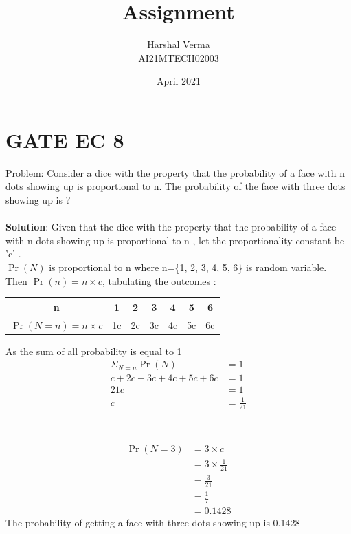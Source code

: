 \documentclass[journal,12pt,twocolumn]{IEEEtran}
\title{Assignment  }
\author{Harshal Verma\\
AI21MTECH02003}
\date{April 2021}
\begin{document}
\maketitle
\section{GATE EC 8}
Problem: Consider a dice with the property that the probability of a face with n dots showing up is proportional to n. The probability of the face with three dots showing up is ?\\
\\
\textbf{Solution}: Given that the dice with the
 property that the probability of a face with n dots showing up is proportional to n , let the proportionality constant be 'c' .\\
 $\Pr(N)$ is proportional to n
 where n=\{1, 2, 3, 4, 5, 6\} is random variable.\\
Then $\Pr(n) = n \times c $, tabulating the outcomes : 
\\
\begin{center}
\begin{tabular}{ |c | c | c | c | c | c | c |}
\hline
n     & 1 & 2 & 3 & 4 & 5 & 6 \\
\hline
$\Pr(N = n ) = n \times c$ & 1c & 2c&3c &4c & 5c & 6c\\
\hline
\end{tabular}
\end{center}
\smallskip
As the sum of all probability is equal to 1\\
\begin{align*}
\Sigma_{N=n} \Pr(N) &= 1\\
c + 2c + 3c + 4c + 5c + 6c &= 1\\
21c &= 1\\
c &= \frac{1}{21}\\
\end{align*}
\smallskip
{} \\
\\
\begin{align*}
\Pr(N=3) &= 3 \times c\\
&= 3\times\frac{1}{21}\\
&= \frac{3}{21}\\
&= \frac{1}{7}\\
&= 0.1428   
\end{align*}
The probability of getting a face with three dots showing up is 0.1428
\samllskip
\end{document}
